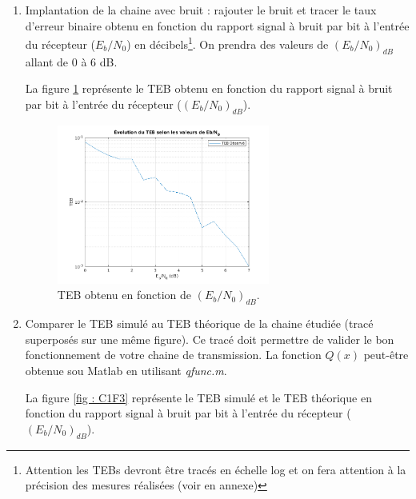 \documentclass[frenchb]{article}
\begin{document}
\begin{enumerate}
        \item Implantation de la chaine avec bruit : rajouter le bruit et tracer le taux d'erreur binaire obtenu en fonction du rapport signal à bruit par bit à l'entrée du récepteur ($E_b/N_0$) en décibels\footnote{Attention les TEBs devront être tracés en échelle log et on fera attention à la précision des mesures réalisées (voir en annexe)}. On prendra des valeurs de $\left(E_b/N_0\right)_{dB}$ allant de $0$ à $6$ dB.
        \par\leavevmode\par
       	\setlength\parindent{0.5cm}
       	La figure \ref{fig : C1F6} représente le TEB obtenu en fonction du rapport signal à bruit par bit à l'entrée du récepteur  ($\left(E_b/N_0\right)_{dB}$). 
        
        \begin{figure}[ht!]
		\centering
		\includegraphics[width=7cm]{C1F6.png}		              	    \caption{TEB obtenu en fonction de $\left(E_b/N_0\right)_{dB}$. \label{fig : C1F6}}
		\end{figure}
		
		\par\leavevmode\par    
        \item Comparer le TEB simulé au TEB théorique de la chaine étudiée (tracé superposés sur une même figure). Ce tracé doit permettre de valider le bon fonctionnement de votre chaine de transmission. La fonction $Q(x)$ peut-être obtenue sou Matlab en utilisant \emph{qfunc.m}.\\
        \par\leavevmode\par
       	
       	La figure \ref{fig : C1F3} représente le TEB simulé et le TEB théorique en fonction du rapport signal à bruit par bit à l'entrée du récepteur  ($\left(E_b/N_0\right)_{dB}$). 
        

\end{enumerate}
\end{document}
